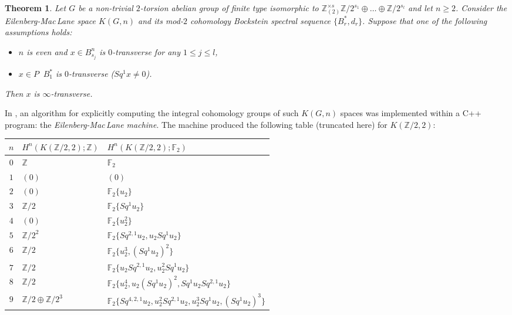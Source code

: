 \documentclass{amsart}
\newtheorem*{thm*}{Theorem}
\theoremstyle{definition}
\theoremstyle{remark}
\DeclareMathOperator{\even}{^{even}}
\newcommand{\Z}{\mathbb{Z}}
\newcommand{\F}{\mathbb{F}}
\renewcommand{\geq}{\geqslant}
\renewcommand{\leq}{\leqslant}
\begin{document}
\begin{thm*}
Let $G$ be a non-trivial $2$-torsion abelian group of finite type isomorphic to $\Z_{(2)}^{\times s}\Z/2^{s_1}\oplus\dots\oplus\Z/2^{s_l}$ and let $n\geq2$. Consider the Eilenberg-Mac\,Lane space $K(G,n)$ and its mod-$2$ cohomology Bockstein spectral sequence $\{B^*_r,d_r\}$. Suppose that one of the following assumptions holds:
\begin{itemize}
\item[$\bullet$]{$n$ is even and $x\in B^n_{s_j}$ is $0$-transverse for any $1\leq j\leq l$,}
\item[$\bullet$]{$x\in P\even B_1^*$ is $0$-transverse ($Sq^1x\not=0$).}
\end{itemize}
Then $x$ is $\infty$-transverse.
\end{thm*}

In \cite{Cl02}, an algorithm for explicitly computing the integral cohomology groups of such $K(G,n)$ spaces was implemented within a C++ program: the {\it Eilenberg-Mac\,Lane machine}. The machine produced the following table (truncated here) for $K(\Z/2,2)$: 

\medskip
\begin{tabular}{|c|p{3cm}|p{8cm}|}
\hline
$n$ &$H^n(K(\Z/2,2);\Z)$ &$H^n(K(\Z/2,2);\F_2)$ \\
\hline

$0$%
&$\Z$
&$\F_2$\\

$1$%
&$(0)$%
&$(0)$\\

$2$%
&$(0)$%
&$\F_2\{u_2\}$\\

$3$%
&$\Z/2$%
&$\F_2\{Sq^1u_2\}$\\

$4$%
&$(0)$%
&$\F_2\{u_2^2\}$\\

$5$%
&$\Z/2^{2}$%
&$\F_2\{Sq^{2,1}u_2,u_2Sq^1u_2\}$\\

$6$%
&$\Z/2$%
&$\F_2\{u_2^3,(Sq^1u_2)^2\}$\\

$7$%
&$\Z/2$%
&$\F_2\{u_2Sq^{2,1}u_2,u_2^2Sq^1u_2\}$\\

$8$%
&$\Z/2$%
&$\F_2\{u_2^4,u_2(Sq^1u_2)^2,Sq^1u_2Sq^{2,1}u_2\}$\\

$9$%
&$\Z/2\oplus\Z/2^{3}$%
&$\F_2\{Sq^{4,2,1}u_2,u_2^2Sq^{2,1}u_2,u_2^3Sq^1u_2,(Sq^1u_2)^3\}$\\

\hline
\end{tabular}
\medskip
\end{document}
